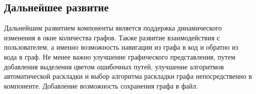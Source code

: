 \documentclass{matmex-diploma}
\begin{document}
\subsection*{Дальнейшее развитие}
Дальнейшим развитием компоненты является поддержка динамического изменения в окне количества графов. Также развитие взаимодействия с пользователем, а именно возможность навигации из графа в код и обратно из кода в граф. Не менее важно улучшение графического представления, путем добавления выделения цветом ошибочных путей, улучшение алгоритмов автоматической раскладки и выбор алгоритма раскладки графа непосредственно в компоненте. Добавление возможность сохранения графа в файл.



\end{document}
